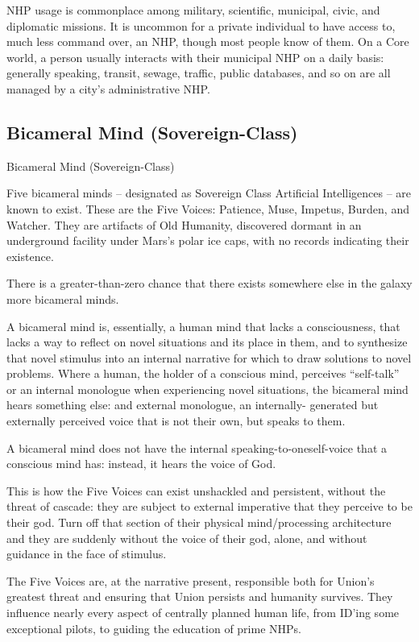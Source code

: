 NHP usage is commonplace among military, scientific, municipal, civic, and diplomatic missions.  
It is uncommon for a private individual to have access to, much less command over, an NHP,  
though most people know of them. On a Core world, a person usually interacts with their  
municipal NHP on a daily basis: generally speaking, transit, sewage, traffic, public databases,  
and so on are all managed by a city’s administrative NHP. 
 
\subsection{Bicameral Mind (Sovereign-Class)}
Bicameral Mind (Sovereign-Class)  

Five bicameral minds -- designated as Sovereign Class Artificial Intelligences -- are known to  
exist. These are the Five Voices: Patience, Muse, Impetus, Burden, and Watcher. They are  
artifacts of Old Humanity, discovered dormant in an underground facility under Mars’s polar ice  
caps, with no records indicating their existence.
 

There is a greater-than-zero chance that there exists somewhere else in the galaxy more  
bicameral minds.  
 

A bicameral mind is, essentially, a human mind that lacks a consciousness, that lacks a way to  
reflect on novel situations and its place in them, and to synthesize that novel stimulus into an  
internal narrative for which to draw solutions to novel problems. Where a human, the holder of a  
conscious mind, perceives “self-talk” or an internal monologue when experiencing novel  
situations, the bicameral mind hears something else: and external monologue, an internally- 
generated but externally perceived voice that is not their own, but speaks to them. 
 

A bicameral mind does not have the internal speaking-to-oneself-voice that a conscious mind  
has: instead, it hears the voice of God. 
 

This is how the Five Voices can exist unshackled and persistent, without the threat of cascade:  
they are subject to external imperative that they perceive to be their god. Turn off that section of  
their physical mind/processing architecture and they are suddenly without the voice of their god,  
alone, and without guidance in the face of stimulus. 
 

The Five Voices are, at the narrative present, responsible both for Union’s greatest threat and   
ensuring that Union persists and humanity survives. They influence nearly every aspect of  
centrally planned human life, from ID’ing some exceptional pilots, to guiding the education of  
prime NHPs. 
 

